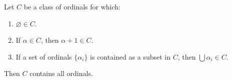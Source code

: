 Let $C$ be a class of ordinals for which:

\begin{enumerate}
\item[(a)] $\varnothing \in C$.
\item[(b)] If $\alpha \in C$, then $\alpha + 1 \in C$.
\item[(c)] If a set of ordinals $\{\alpha_i\}$ is contained as a subset in $C$, then $\bigcup \alpha_i \in C$.
\end{enumerate}

Then $C$ contains all ordinals.
